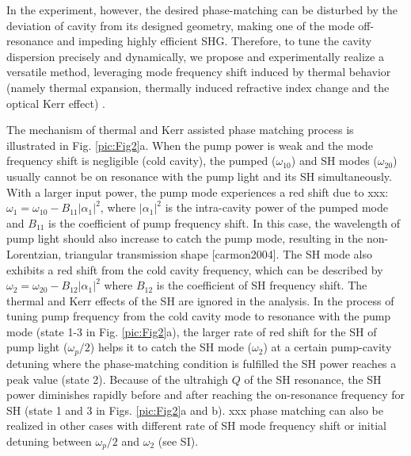 \documentclass[a4paper,8pt,hyperref, twocolumn]{article}
\begin{document}
In the experiment, however, the desired phase-matching can be disturbed by the deviation of cavity from its designed geometry, making one of the mode off-resonance and impeding highly efficient SHG. 
Therefore, to tune the cavity dispersion precisely and dynamically, we propose and experimentally realize a versatile method, leveraging mode frequency shift induced by thermal behavior (namely thermal expansion, thermally induced refractive index change and the optical Kerr effect) \cite{del2011octave, herr2014temporal}.

The mechanism of thermal and Kerr assisted phase matching process is illustrated in Fig. \ref{pic:Fig2}a. 
When the pump power is weak and the mode frequency shift is negligible (cold cavity), the pumped ($\omega_{10}$) and SH modes ($\omega_{20}$) usually cannot be on resonance with the pump light and its SH simultaneously. 
With a larger input power, the pump mode experiences a red shift due to xxx: $\omega_1 = \omega_{10}-B_{11}|\alpha_1|^2$, where $|\alpha_1|^2$ is the intra-cavity power of the pumped mode and $B_{11}$ is the coefficient of pump frequency shift. In this case, the wavelength of pump light should also increase to catch the pump mode, resulting in the non-Lorentzian, triangular transmission shape [carmon2004].
The SH mode also exhibits a red shift from the cold cavity frequency, which can be described by $\omega_2 = \omega_{20}-B_{12}|\alpha_1|^2$ where $B_{12}$ is the coefficient of SH frequency shift. The thermal and Kerr effects of the SH are ignored in the analysis.
In the process of tuning pump frequency from the cold cavity mode to resonance with the pump mode (state 1-3 in Fig. \ref{pic:Fig2}a), the larger rate of red shift for the SH of pump light ($\omega_p/2$) helps it to catch the SH mode ($\omega_2$) at a certain pump-cavity detuning  where the phase-matching condition is fulfilled the SH power reaches a peak value (state 2).
Because of the ultrahigh $Q$ of the SH resonance, the SH power diminishes rapidly before and after reaching the on-resonance frequency for SH (state 1 and 3 in Figs. \ref{pic:Fig2}a and b). 
xxx phase matching can also be realized in other cases with different rate of SH mode frequency shift or initial detuning between $\omega_p/2$ and $\omega_2$ (see SI).
\end{document}
